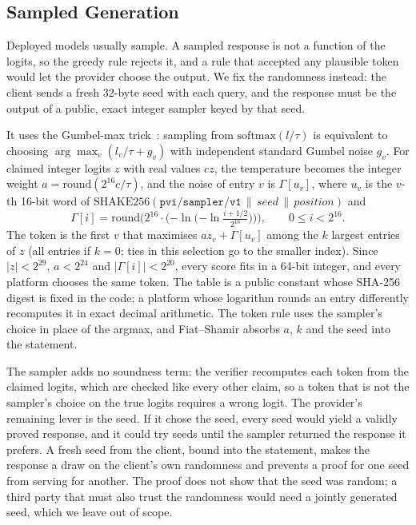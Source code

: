 \subsection{Sampled Generation}
\label{sec:gen-sampling}

Deployed models usually sample. A sampled response is not a function of the logits, so the greedy
rule rejects it, and a rule that accepted any plausible token would let the provider choose the
output. We fix the randomness instead: the client sends a fresh 32-byte seed with each query, and
the response must be the output of a public, exact integer sampler keyed by that seed.

 It uses the Gumbel-max trick~\cite{gumbel1954,maddison2014astar}: sampling
from $\mathrm{softmax}(l/\tau)$ is equivalent to choosing $\arg\max_v(l_v/\tau+g_v)$ with
independent standard Gumbel noise $g_v$. For claimed integer logits $z$ with real values $cz$, the
temperature becomes the integer weight $a=\mathrm{round}(2^{16}c/\tau)$, and the noise of entry
$v$ is $\Gamma[u_v]$, where $u_v$ is the $v$-th 16-bit word of
$\mathrm{SHAKE256}(\texttt{pvi/sampler/v1}\,\|\,\mathit{seed}\,\|\,\mathit{position})$ and
\begin{equation}
  \Gamma[i] = \mathrm{round}\Big(2^{16}\cdot\big({-\ln}\big({-\ln}\tfrac{i+1/2}{2^{16}}\big)\big)\Big),
  \qquad 0\le i<2^{16}.
  \label{eq:gumbel-table}
\end{equation}
The token is the first $v$ that maximises $az_v+\Gamma[u_v]$ among the $k$ largest entries of $z$
(all entries if $k=0$; ties in this selection go to the smaller index). Since $|z|<2^{29}$,
$a<2^{24}$ and $|\Gamma[i]|<2^{20}$, every score fits in a 64-bit integer, and every platform
chooses the same token. The table is a public constant whose SHA-256 digest is fixed in the code;
a platform whose logarithm rounds an entry differently recomputes it in exact decimal arithmetic.
The token rule uses the sampler's choice in place of the argmax, and Fiat--Shamir absorbs $a$,
$k$ and the seed into the statement.

 The sampler adds no soundness term: the
verifier recomputes each token from the claimed logits, which are checked like every other claim,
so a token that is not the sampler's choice on the true logits requires a wrong logit. The
provider's remaining lever is the seed. If it chose the seed, every seed would yield a validly
proved response, and it could try seeds until the sampler returned the response it prefers. A
fresh seed from the client, bound into the statement, makes the response a draw on the client's
own randomness and prevents a proof for one seed from serving for another.
The proof does not show that the seed was random; a third party that must also trust the
randomness would need a jointly generated seed, which we leave out of scope.

